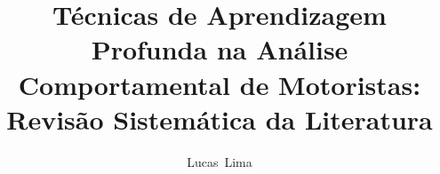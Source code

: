 \documentclass[10pt,journal,compsoc]{IEEEtran}
\begin{document}
%
\title{Técnicas de Aprendizagem Profunda na Análise Comportamental de
  Motoristas: \\
  Revisão Sistemática da Literatura}
%
%
%
%

\author{Lucas~Lima}
% 
%
\end{document}
